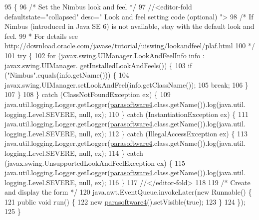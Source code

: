 \begin{DoxyCode}
95                                            \{
96         \textcolor{comment}{/* Set the Nimbus look and feel */}
97         \textcolor{comment}{//<editor-fold defaultstate="collapsed" desc=" Look and feel setting code (optional) ">}
98         \textcolor{comment}{/* If Nimbus (introduced in Java SE 6) is not available, stay with the default look and feel.}
99 \textcolor{comment}{         * For details see http://download.oracle.com/javase/tutorial/uiswing/lookandfeel/plaf.html }
100 \textcolor{comment}{         */}
101         \textcolor{keywordflow}{try} \{
102             \textcolor{keywordflow}{for} (javax.swing.UIManager.LookAndFeelInfo info : javax.swing.UIManager.
      getInstalledLookAndFeels()) \{
103                 \textcolor{keywordflow}{if} (\textcolor{stringliteral}{"Nimbus"}.equals(info.getName())) \{
104                     javax.swing.UIManager.setLookAndFeel(info.getClassName());
105                     \textcolor{keywordflow}{break};
106                 \}
107             \}
108         \} \textcolor{keywordflow}{catch} (ClassNotFoundException ex) \{
109             java.util.logging.Logger.getLogger(\mbox{\hyperlink{classsoftware_1_1parasoftware4_a045ccbe7058acf5332dae140a7c6485d}{parasoftware4}}.class.getName()).log(java.util.
      logging.Level.SEVERE, null, ex);
110         \} \textcolor{keywordflow}{catch} (InstantiationException ex) \{
111             java.util.logging.Logger.getLogger(\mbox{\hyperlink{classsoftware_1_1parasoftware4_a045ccbe7058acf5332dae140a7c6485d}{parasoftware4}}.class.getName()).log(java.util.
      logging.Level.SEVERE, null, ex);
112         \} \textcolor{keywordflow}{catch} (IllegalAccessException ex) \{
113             java.util.logging.Logger.getLogger(\mbox{\hyperlink{classsoftware_1_1parasoftware4_a045ccbe7058acf5332dae140a7c6485d}{parasoftware4}}.class.getName()).log(java.util.
      logging.Level.SEVERE, null, ex);
114         \} \textcolor{keywordflow}{catch} (javax.swing.UnsupportedLookAndFeelException ex) \{
115             java.util.logging.Logger.getLogger(\mbox{\hyperlink{classsoftware_1_1parasoftware4_a045ccbe7058acf5332dae140a7c6485d}{parasoftware4}}.class.getName()).log(java.util.
      logging.Level.SEVERE, null, ex);
116         \}
117         \textcolor{comment}{//</editor-fold>}
118 
119         \textcolor{comment}{/* Create and display the form */}
120         java.awt.EventQueue.invokeLater(\textcolor{keyword}{new} Runnable() \{
121             \textcolor{keyword}{public} \textcolor{keywordtype}{void} run() \{
122                 \textcolor{keyword}{new} \mbox{\hyperlink{classsoftware_1_1parasoftware4_a045ccbe7058acf5332dae140a7c6485d}{parasoftware4}}().setVisible(\textcolor{keyword}{true});
123             \}
124         \});
125     \}
\end{DoxyCode}


